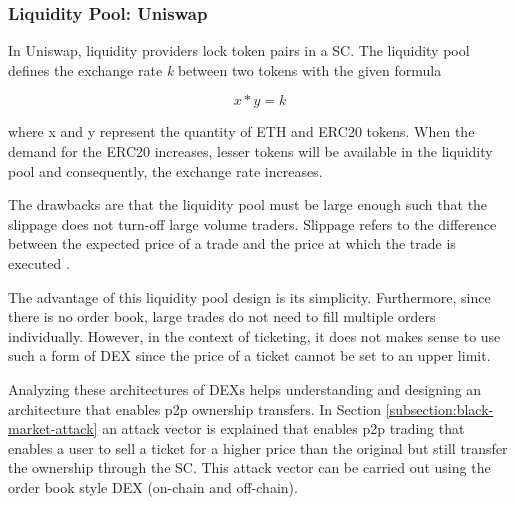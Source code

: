 \subsubsection{Liquidity Pool: Uniswap}

In Uniswap, liquidity providers lock token pairs in a SC. The liquidity pool defines the exchange rate \textit{k} between two tokens with the given formula 

\[ x * y = k \]

where x and y represent the quantity of ETH and ERC20 tokens. When the demand for the ERC20 increases, lesser tokens will be available in the liquidity pool and consequently, the exchange rate increases. 

The drawbacks are that the liquidity pool must be large enough such that the slippage does not turn-off large volume traders. Slippage refers to the difference between the expected price of a trade and the price at which the trade is executed \cite{slippage}. 

The advantage of this liquidity pool design is its simplicity. Furthermore, since there is no order book, large trades do not need to fill multiple orders individually. However, in the context of ticketing, it does not makes sense to use such a form of DEX since the price of a ticket cannot be set to an upper limit. 

Analyzing these architectures of DEXs helps understanding and designing an architecture that enables p2p ownership transfers. In Section \ref{subsection:black-market-attack} an attack vector is explained that enables p2p trading that enables a user to sell a ticket for a higher price than the original but still transfer the ownership through the SC. This attack vector can be carried out using the order book style DEX (on-chain and off-chain).
